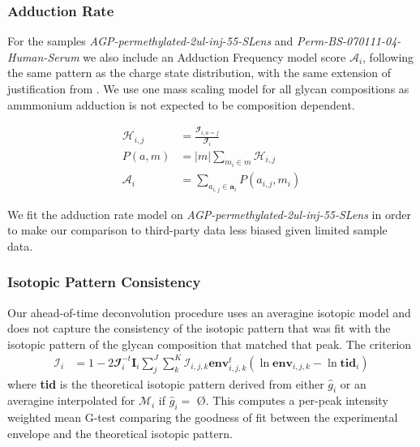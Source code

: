 \documentclass{article}
\begin{document}
    \subsubsection{Adduction Rate}
        For the samples \textit{AGP-permethylated-2ul-inj-55-SLens} and \textit{Perm-BS-070111-04-Human-Serum}
        we also include an Adduction Frequency model score $\mathscr{A}_i$, following the same
        pattern as the charge state distribution, with the same extension of justification
        from \cite{Maxwell2012}. We use one mass scaling model for all glycan compositions
        as ammmonium adduction is not expected to be composition dependent.

        \begin{align}
            \mathcal{H}_{i,j} &= \frac{
                \mathbfcal{I}_{i, a=j}}{\mathbfcal{I}_i} \nonumber\\
            P(a, m) &= |m|\sum_{m_i \in m} \mathcal{H}_{i, j} \nonumber\\
            \mathscr{A}_i &= \sum_{a_{i, j} \in \mathbf{a}_i}{P(a_{i, j}, m_i)}
        \end{align}

        We fit the adduction rate model on \textit{AGP-permethylated-2ul-inj-55-SLens} in order
        to make our comparison to third-party data less biased given limited sample data.

    \subsubsection{Isotopic Pattern Consistency}
        Our ahead-of-time deconvolution procedure uses an averagine isotopic model and does not
        capture the consistency of the isotopic pattern that was fit with the isotopic pattern
        of the glycan composition that matched that peak. The criterion
        \begin{align}
            \mathscr{I}_i &= 1 - 2\mathbfcal{I}_i^{-t}\mathbf{I}_i\sum_j^J{
                \sum_k^K{\mathcal{I}_{i, j, k}
                    \textbf{env}_{i, j, k}^t\left(
                        \ln{\textbf{env}}_{i, j, k} -
                        \ln{\textbf{tid}_{i}}
                    \right)
                }
            }
        \end{align}
        \noindent where \textbf{tid} is the theoretical isotopic pattern derived from either ${\hat g}_i$
        or an averagine interpolated for $\mathcal{M}_i$ if ${\hat g}_i =$ \O. This computes a
        per-peak intensity weighted mean G-test comparing the goodness of fit between the experimental
        envelope and the theoretical isotopic pattern.
\end{document}
